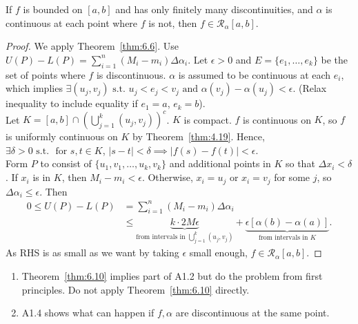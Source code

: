 \begin{thm}[10]
	If $f$ is bounded on $[a,b]$ and has only finitely many discontinuities, and $\alpha$ is continuous at each point where $f$ is not, then $f \in \mathscr{R}_{\alpha}[a,b]$.
	\begin{proof}
		We apply Theorem~\ref{thm:6.6}.
		Use $U(P)-L(P)=\sum_{i=1}^{n}{( M_{i}-m_{i} )\Delta \alpha_{i}}$.
		Let $\epsilon>0$ and $E=\{e_1,\ldots ,e_{k}\} $ be the set of points where $f$ is discontinuous.
		$\alpha$ is assumed to be continuous at each $e_i$, which implies $\exists{(u_j,v_j)} \text{ s.t. } u_j<e_j<v_j \text{ and } \alpha(v_j)-\alpha(u_j)<\epsilon$. (Relax inequality to include equality if $e_1=a$, $e_k=b$).\\
		Let $K=[a,b] \cap \left(\bigcup_{j=1}^{k}(u_j,v_j)\right)^{c}$. $K$ is compact.
		$f$ is continuous on $K$, so $f$ is uniformly continuous on $K$ by Theorem~\ref{thm:4.19}.
		Hence, $\exists{\delta>0} \text{ s.t. } \text{ for } s ,t \in K$, $|s-t|<\delta \implies |f(s)-f(t)|<\epsilon$.\\
		Form $P$ to consist of $\{u_1,v_1,\ldots ,u_{k},v_{k}\}$ and additional points in $K$ so that $\Delta x_i < \delta$.
		If $x_i$ is in $K$, then $M_i-m_i<\epsilon$.
		Otherwise, $x_i=u_j$ or $x_i=v_j$ for some $j$, so $\Delta \alpha_i \le \epsilon$. Then
		\begin{align*}
			0\le U(P)-L(P) & =\sum_{i=1}^{n}{(M_{i}-m_{i}) \Delta \alpha_i}                                                                                                                         \\
			               & \le \underbrace{k \cdot 2M \epsilon}_{\text{from intervals in $\bigcup_{j=1}^{k}(u_j,v_j)$}}+\underbrace{\epsilon[\alpha(b)-\alpha(a)]}_{\text{from intervals in $K$}}
			.
		\end{align*}
		As RHS is as small as we want by taking $\epsilon$ small enough, $f \in \mathscr{R}_{\alpha}[a,b]$.
	\end{proof}
	\begin{remark}
		\begin{enumerate}
			\item Theorem~\ref{thm:6.10} implies part of A1.2 but do the problem from first principles. Do not apply Theorem~\ref{thm:6.10} directly.
			\item A1.4 shows what can happen if $f,\alpha$ are discontinuous at the same point.
		\end{enumerate}
	\end{remark}
\end{thm}

